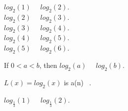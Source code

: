 \documentclass{ximera}
\author{Lee Wayand}
\begin{document}
\begin{example}


\begin{question}


$log_2(1)$ \, \wordChoice{\choice[correct]{<} \choice{>}} \, $log_2(2)$.  \\

$log_2(2)$ \, \wordChoice{\choice[correct]{<} \choice{>}} \, $log_2(3)$.  \\

$log_2(3)$ \, \wordChoice{\choice[correct]{<} \choice{>}} \, $log_2(4)$.  \\

$log_2(4)$ \, \wordChoice{\choice[correct]{<} \choice{>}} \, $log_2(5)$.  \\

$log_2(5)$ \, \wordChoice{\choice[correct]{<} \choice{>}} \, $log_2(6)$.  \\


\end{question}




\begin{question}



If $0 < a < b$, then $log_2(a)$ \, \wordChoice{\choice[correct]{<} \choice{>}} \, $log_2(b)$.  \\



\end{question}





\begin{question}



$L(x) = log_2(x)$  is a(n) \,  .  \\



\end{question}














\begin{question}


$log_{\tfrac{1}{3}}(1)$ \, \wordChoice{\choice{<} \choice[correct]{>}} \, $log_{\tfrac{1}{3}}(2)$.  \\


\end{question}
\end{example}
\end{document}
